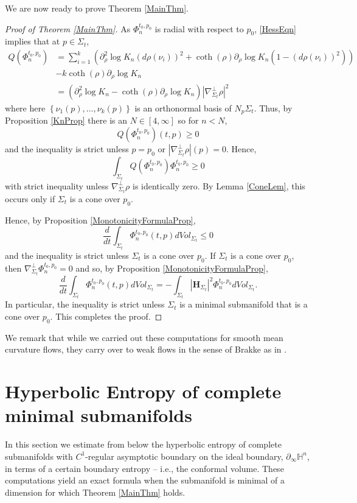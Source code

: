\documentclass{amsart}
\theoremstyle{definition}
\theoremstyle{remark}
\numberwithin{equation}{section}
\newcommand{\set}[1]{\left\{#1\right\}}
\begin{document}
 We are now ready to prove Theorem \ref{MainThm}.
 \begin{proof}[Proof of Theorem \ref{MainThm}]
   As $\Phi_n^{t_0,p_0}$ is radial with respect to $p_0$, \eqref{HessEqn} implies that at $p\in \Sigma_t$,
\begin{align*}
 Q(\Phi_{n}^{t_0,p_0}) &=  \sum_{i=1}^k \left(  \partial^2_\rho \log K_n (d\rho(\nu_i))^2  +\coth(\rho) \partial_\rho \log K_n \left( 1-(d\rho(\nu_i))^2\right) \right)\\
 &-k\coth(\rho) \partial_\rho \log K_n\\
 &=
 \left(\partial^{2}_\rho \log K_n-\coth(\rho) \partial_\rho \log K_n\right) |\nabla_{\Sigma_t}^\perp \rho|^2
\end{align*}
where here $\set{\nu_1(p), \ldots, \nu_k(p)}$ is an orthonormal basis of $N_p \Sigma_t$.
  Thus, by Proposition \ref{KnProp} there is an $N\in [4,\infty]$ so for $n<N$, 
  $$
 Q(\Phi_{n}^{t_0,p_0})(t,p)\geq 0
  $$
  and the inequality is strict unless $p=p_0$ or $|\nabla_{\Sigma_t}^\perp \rho|(p)=0$.  
  Hence,
  $$
  \int_{\Sigma_t} Q(\Phi_{n}^{t_0,p_0}) \Phi_n^{t_0,p_0}\geq 0
  $$
  with strict inequality unless $\nabla_{\Sigma_t}^\perp \rho$ is identically zero.  By Lemma \ref{ConeLem}, this occurs only if $\Sigma_t$ is a cone over $p_0$.
  
  Hence, by Proposition \ref{MonotonicityFormulaProp},
  $$ 
  \frac{d}{dt} \int_{\Sigma_t} \Phi_n^{t_0,p_0}(t,p) dVol_{\Sigma_t}\leq 0
  $$
  and the inequality is strict unless $\Sigma_t$ is a cone over $p_0$.  If $\Sigma_t$ is a cone over $p_0$, then $\nabla^\perp_{\Sigma_t} \Phi_n^{t_0,p_0}=0$ and so, by Proposition \ref{MonotonicityFormulaProp},
  $$ 
  \frac{d}{dt} \int_{\Sigma_t} \Phi_n^{t_0,p_0}(t,p) dVol_{\Sigma_t}=-\int_{\Sigma_t} |\mathbf{H}_{\Sigma_t}|^2 \Phi_n^{t_0,p_0} dVol_{\Sigma_t}.
  $$
  In particular, the inequality is strict unless $\Sigma_t$ is a minimal submanifold that is a cone over $p_0$.  This completes the proof.
 \end{proof}
 
 We remark that while we carried out these computations for smooth mean curvature flows, they carry over to weak flows in the sense of Brakke as in \cite{IlmanenMon}.

\section{Hyperbolic Entropy of complete minimal submanifolds}
In this section we estimate from below the hyperbolic entropy of complete submanifolds with $C^1$-regular asymptotic boundary on the ideal boundary, $\partial_\infty \mathbb{H}^n$, in terms of a certain boundary entropy -- i.e., the conformal volume. These computations yield an exact formula when the submanifold is minimal of a dimension for which Theorem \ref{MainThm} holds.
\end{document}
